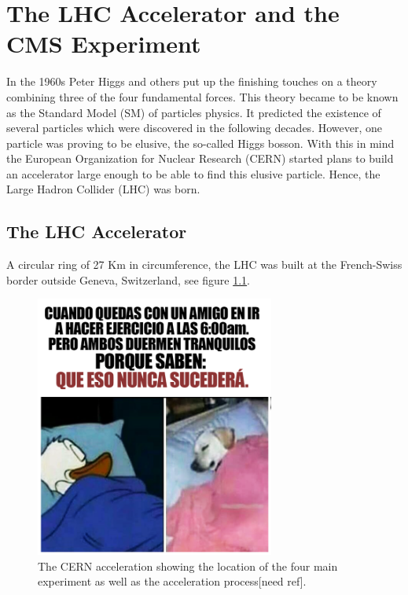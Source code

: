 
\chapter{The LHC Accelerator and the CMS Experiment}\label{ch:lhcandcms}
In the 1960s Peter Higgs and others {\color{red}} put up the finishing touches on a theory combining three of the four fundamental forces. This theory became to be known as the Standard Model (SM) of particles physics. It predicted the existence of several particles which were discovered in the following decades. However, one particle was proving to be elusive, the so-called Higgs bosson. With this in mind the European Organization for Nuclear Research (CERN) started plans to build an accelerator large enough to be able to find this elusive particle. Hence, the Large Hadron Collider (LHC) was born. 

\section{The LHC Accelerator}
A circular ring of 27 Km in circumference, the LHC was built at the French-Swiss border outside Geneva, Switzerland, see figure \ref{fig:cern}. 

\begin{figure}[!h]
  \centering
  \includegraphics[width=0.7\textwidth]{../images/ch2/11}
  \caption[The CERN acceleration ]{The CERN acceleration  showing the location of the four main experiment as well as the acceleration process[need ref].}\label{fig:cern}
\end{figure}




